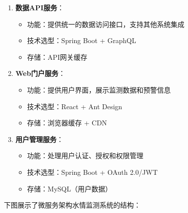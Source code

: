 \begin{enumerate}
  \begin{itemize}
  \tightlist
  \item
    功能：将预警信息推送给相关人员和系统
  \item
    技术选型：Node.js + WebSocket/消息推送API
  \item
    存储：Redis（推送状态缓存）
  \end{itemize}
\item
  \textbf{数据API服务}：

  \begin{itemize}
  \tightlist
  \item
    功能：提供统一的数据访问接口，支持其他系统集成
  \item
    技术选型：Spring Boot + GraphQL
  \item
    存储：API网关缓存
  \end{itemize}
\item
  \textbf{Web门户服务}：

  \begin{itemize}
  \tightlist
  \item
    功能：提供用户界面，展示监测数据和预警信息
  \item
    技术选型：React + Ant Design
  \item
    存储：浏览器缓存 + CDN
  \end{itemize}
\item
  \textbf{用户管理服务}：

  \begin{itemize}
  \tightlist
  \item
    功能：处理用户认证、授权和权限管理
  \item
    技术选型：Spring Boot + OAuth 2.0/JWT
  \item
    存储：MySQL（用户数据）
  \end{itemize}
\end{enumerate}

下图展示了微服务架构水情监测系统的结构：

